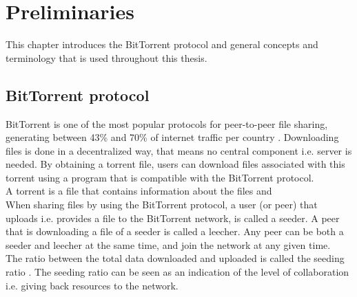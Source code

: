 \chapter{Preliminaries}
\label{chp:preliminaries}

This chapter introduces the BitTorrent protocol and general concepts and terminology that is used throughout this thesis.

\section{BitTorrent protocol}
BitTorrent is one of the most popular protocols for peer-to-peer file sharing, generating between 43\% and 70\% of internet traffic per country .
Downloading files is done in a decentralized way, that means no central component i.e. server is needed.
By obtaining a torrent file, users can download files associated with this torrent using a program that is compatible with the BitTorrent protocol.\\

A torrent is a file that contains information about the files and \\
 
When sharing files by using the BitTorrent protocol, a user (or peer) that uploads i.e. provides a file to the BitTorrent network, is called a seeder.
A peer that is downloading a file of a seeder is called a leecher.
Any peer can be both a seeder and leecher at the same time, and join the network at any given time.\\

The ratio between the total data downloaded and uploaded is called the seeding ratio \cite{Cohen-bittorrent}.
The seeding ratio can be seen as an indication of the level of collaboration i.e. giving back resources to the network.\\


